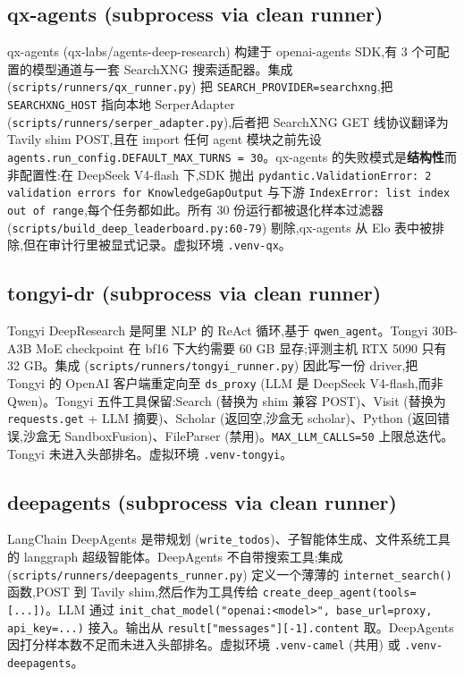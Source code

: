 \documentclass[UTF8,a4paper,12pt,oneside]{ctexart}
\begin{document}
\subsection{qx-agents (subprocess via clean runner)}

qx-agents (qx-labs/agents-deep-research) 构建于 openai-agents SDK,有 3 个可配置的模型通道与一套 SearchXNG 搜索适配器。集成 (\texttt{scripts/runners/qx\_runner.py}) 把 \texttt{SEARCH\_PROVIDER=searchxng},把 \texttt{SEARCHXNG\_HOST} 指向本地 SerperAdapter (\texttt{scripts/runners/serper\_adapter.py}),后者把 SearchXNG GET 线协议翻译为 Tavily shim POST,且在 import 任何 agent 模块之前先设 \texttt{agents.run\_config.DEFAULT\_MAX\_TURNS = 30}。qx-agents 的失败模式是\textbf{结构性}而非配置性:在 DeepSeek V4-flash 下,SDK 抛出 \texttt{pydantic.ValidationError: 2 validation errors for KnowledgeGapOutput} 与下游 \texttt{IndexError: list index out of range},每个任务都如此。所有 30 份运行都被退化样本过滤器 (\texttt{scripts/build\_deep\_leaderboard.py:60-79}) 剔除,qx-agents 从 Elo 表中被排除,但在审计行里被显式记录。虚拟环境 \texttt{.venv-qx}。

\subsection{tongyi-dr (subprocess via clean runner)}

Tongyi DeepResearch 是阿里 NLP 的 ReAct 循环,基于 \texttt{qwen\_agent}。Tongyi 30B-A3B MoE checkpoint 在 bf16 下大约需要 60 GB 显存;评测主机 RTX 5090 只有 32 GB。集成 (\texttt{scripts/runners/tongyi\_runner.py}) 因此写一份 driver,把 Tongyi 的 OpenAI 客户端重定向至 \texttt{ds\_proxy} (LLM 是 DeepSeek V4-flash,而非 Qwen)。Tongyi 五件工具保留:Search (替换为 shim 兼容 POST)、Visit (替换为 \texttt{requests.get} + LLM 摘要)、Scholar (返回空,沙盒无 scholar)、Python (返回错误,沙盒无 SandboxFusion)、FileParser (禁用)。\texttt{MAX\_LLM\_CALLS=50} 上限总迭代。Tongyi 未进入头部排名。虚拟环境 \texttt{.venv-tongyi}。

\subsection{deepagents (subprocess via clean runner)}

LangChain DeepAgents 是带规划 (\texttt{write\_todos})、子智能体生成、文件系统工具的 langgraph 超级智能体。DeepAgents 不自带搜索工具;集成 (\texttt{scripts/runners/deepagents\_runner.py}) 定义一个薄薄的 \texttt{internet\_search()} 函数,POST 到 Tavily shim,然后作为工具传给 \texttt{create\_deep\_agent(tools=[...])}。LLM 通过 \texttt{init\_chat\_model("openai:<model>", base\_url=proxy, api\_key=...)} 接入。输出从 \texttt{result["messages"][-1].content} 取。DeepAgents 因打分样本数不足而未进入头部排名。虚拟环境 \texttt{.venv-camel} (共用) 或 \texttt{.venv-deepagents}。
\end{document}
